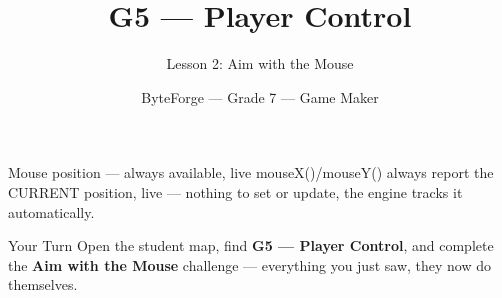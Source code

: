 \documentclass[aspectratio=169]{beamer}
\title{G5 — Player Control}
\subtitle{Lesson 2: Aim with the Mouse}
\author{ByteForge --- Grade 7 --- Game Maker}
\date{}
\begin{document}
\begin{frame}
    \titlepage
\end{frame}

\begin{frame}{Mouse position — always available, live}
    \Large
    mouseX()/mouseY() always report the CURRENT position, live — nothing to set or update, the engine tracks it automatically.

    \begin{center}
    \end{center}
\end{frame}

\begin{frame}{Your Turn}
    \Large
    Open the student map, find \textbf{G5 — Player Control}, and complete
    the \textbf{Aim with the Mouse} challenge --- everything you just saw, they now do themselves.
\end{frame}
\end{document}

